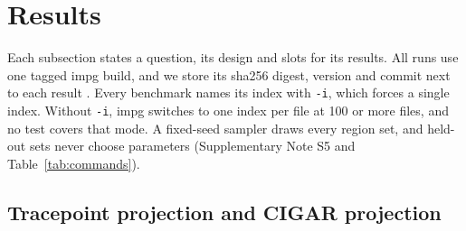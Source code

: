 \section{Results}
\label{sec:results}

Each subsection states a question, its design and slots for its results.
All runs use one tagged impg build, and we store its sha256 digest, version and commit next to each result .
Every benchmark names its index with \texttt{-i}, which forces a single index.
Without \texttt{-i}, impg switches to one index per file at 100 or more files, and no test covers that mode.
A fixed-seed sampler draws every region set, and held-out sets never choose parameters (Supplementary Note S5 and Table~\ref{tab:commands}).

\subsection{Tracepoint projection and CIGAR projection}
\label{sec:res-tpa}

